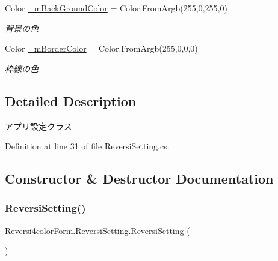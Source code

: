 \begin{DoxyCompactItemize}
\mbox{\label{class_reversi4color_form_1_1_reversi_setting_ac863c98e99b025a21dbe40215f4f1c11}} 
Color \hyperlink{class_reversi4color_form_1_1_reversi_setting_ac863c98e99b025a21dbe40215f4f1c11}{\+\_\+m\+Back\+Ground\+Color} = Color.\+From\+Argb(255,0,255,0)
\begin{DoxyCompactList}\small\item\em 背景の色 \end{DoxyCompactList}\item 
\mbox{\label{class_reversi4color_form_1_1_reversi_setting_ac31640e7486bcc950cecf5d0f8bd34f3}} 
Color \hyperlink{class_reversi4color_form_1_1_reversi_setting_ac31640e7486bcc950cecf5d0f8bd34f3}{\+\_\+m\+Border\+Color} = Color.\+From\+Argb(255,0,0,0)
\begin{DoxyCompactList}\small\item\em 枠線の色 \end{DoxyCompactList}\end{DoxyCompactItemize}


\subsection{Detailed Description}
アプリ設定クラス 

Definition at line 31 of file Reversi\+Setting.\+cs.



\subsection{Constructor \& Destructor Documentation}
\mbox{\label{class_reversi4color_form_1_1_reversi_setting_a88a0c05a8cc876cc6c8ab87e9514f40b}} 
\subsubsection{\texorpdfstring{Reversi\+Setting()}{ReversiSetting()}}
{\footnotesize\ttfamily Reversi4color\+Form.\+Reversi\+Setting.\+Reversi\+Setting (\begin{DoxyParamCaption}{ }\end{DoxyParamCaption})}



